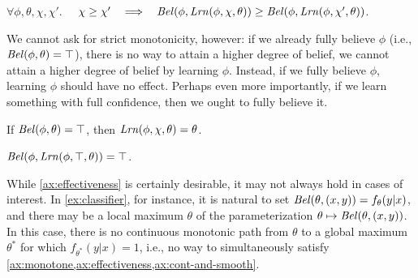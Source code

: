 \begin{LrnBelAxioms}
	\item 
	$\forall \phi,\theta,\chi,\chi'.\quad$
	$\chi \ge \chi'
	~~\implies~~
	\mathit{Bel}(\phi, \mathit{Lrn}(\phi,\chi,\theta)) \ge \mathit{Bel}(\phi, \mathit{Lrn}(\phi, \chi', \theta))
	$.
		\label{ax:monotone}
\end{LrnBelAxioms}

We cannot ask for strict monotonicity, however:
if we already fully believe $\phi$ (i.e., $\mathit{Bel}(\phi,\theta) = \top$),
there is no way to attain a higher degree of belief, we cannot attain a higher degree of belief by learning $\phi$.
Instead, if we fully believe $\phi$, learning $\phi$ should
	have no effect.
Perhaps even more importantly, 
 	if we learn something with full confidence, then we ought to fully believe it.
\begin{LrnBelAxioms}
\item If $\mathit{Bel}(\phi,\theta) = \top$, then
    $\mathit{Lrn}(\phi,\chi,\theta) = \theta$. 
    \label{ax:truth-is-enough}
% 
% 
    \item $\mathit{Bel}(\phi, \mathit{Lrn}(\phi,\top,\theta)) = \top$.
        \label{ax:effectiveness}
\end{LrnBelAxioms}

While
\cref{ax:effectiveness} is certainly desirable,
		it may not always hold in cases of interest.
	In \cref{ex:classifier}, for instance,
		it is natural to set $\mathit{Bel}(\theta,(x,y)) = f_\theta(y|x)$,
	and there may be a local maximum $\theta$ of the parameterization
		$\theta \mapsto \mathit{Bel}(\theta,(x,y))$.
	In this case, there is no continuous monotonic path from $\theta$ to a global maximum $\theta^*$ for which $f_{\theta^*}(y|x) = 1$,
	i.e., no way to simultaneously satisfy 
	\cref{ax:monotone,ax:effectiveness,ax:cont-and-smooth}.


